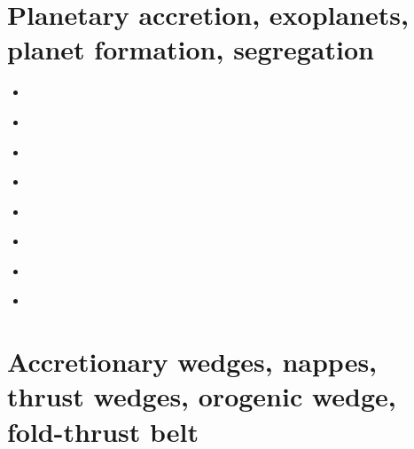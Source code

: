 \section{Planetary accretion, exoplanets, planet formation, segregation}

\begin{scriptsize}
\begin{itemize}
\item[\twothousandeight] 
\item[\twothousandnine] 
\\
\item[\twothousandten] 
\item[\twothousandeleven] 
\\
\item[\twothousandthirteen] 
\item[\twothousandfourteen] 
\\
\item[\twothousandnineteen] 
\\
\item[\twothousandtwenty] 
\end{itemize}
\end{scriptsize}

\section{Accretionary wedges, nappes, thrust wedges, orogenic wedge, fold-thrust belt} 

